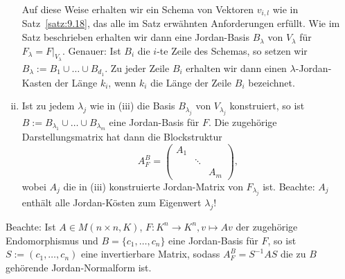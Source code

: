 \begin{bemerkung}
\begin{enumerate}[(i)]
		Auf diese Weise erhalten wir ein Schema von Vektoren $v_{i,l}$ wie in Satz~\ref{satz:9.18}, das alle im Satz erwähnten Anforderungen erfüllt.
		Wie im Satz beschrieben erhalten wir dann eine Jordan-Basis $B_\lambda$ von $V_\lambda$ für $F_\lambda = F \big|_{V_\lambda}$.
		Genauer: Ist $B_i$ die $i$-te Zeile des Schemas, so setzen wir $B_\lambda := B_1 \cup \dots \cup B_{d_1}$.
		Zu jeder Zeile $B_i$ erhalten wir dann einen $\lambda$-Jordan-Kasten der Länge $k_i$, wenn $k_i$ die Länge der Zeile $B_i$ bezeichnet.
		\item Ist zu jedem $\lambda_j$ wie in (iii) die Basis $B_{\lambda_j}$ von $V_{\lambda_j}$ konstruiert, so ist $B:= B_{\lambda_1} \cup \dots \cup B_{\lambda_m}$ eine Jordan-Basis für $F$.
		Die zugehörige Darstellungsmatrix hat dann die Blockstruktur
		\[
			A_F^B = \begin{pmatrix}
			A_1 & & \\
			& \ddots & \\
			& & A_m
			\end{pmatrix},
		\]
		wobei $A_j$ die in (iii) konstruierte Jordan-Matrix von $F_{\lambda_j}$ ist.
		Beachte: $A_j$ enthält alle Jordan-Kösten zum Eigenwert $\lambda_j$!
	\end{enumerate}
\end{bemerkung}

Beachte: Ist $A \in M(n \times n,K)$, $F \colon K^n \rightarrow K^n, v \mapsto Av$ der zugehörige Endomorphismus und $B = \{c_1,\dots,c_n\}$ eine Jordan-Basis für $F$, so ist $S := (c_1,\dots,c_n)$ eine invertierbare Matrix, sodass $A_F^B = S^{-1}AS$ die zu $B$ gehörende Jordan-Normalform ist.

